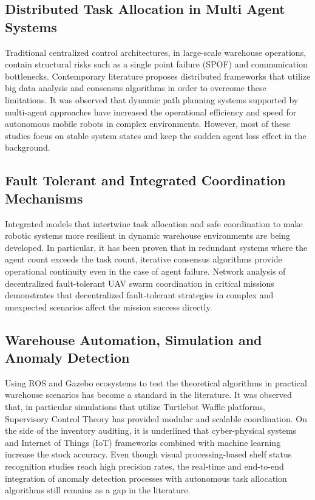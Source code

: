 \documentclass[conference]{IEEEtran}
\begin{document}
\subsection{Distributed Task Allocation in Multi Agent Systems}

Traditional centralized control architectures, in large-scale warehouse operations, contain structural risks such as a single point failure (SPOF) and communication bottlenecks. Contemporary literature proposes distributed frameworks that utilize big data analysis and consensus algorithms in order to overcome these limitations\cite{hayes2026decentralized}. It was observed that dynamic path planning systems supported by multi-agent approaches have increased the operational efficiency and speed for autonomous mobile robots in complex environments\cite{fourie2025development}. However, most of these studies focus on stable system states and keep the sudden agent loss effect in the background.

\subsection{Fault Tolerant and Integrated Coordination Mechanisms}

Integrated models that intertwine task allocation and safe coordination to make robotic systems more resilient in dynamic warehouse environments are being developed\cite{miele2025distributed}. In particular, it has been proven that in redundant systems where the agent count exceeds the task count, iterative consensus algorithms provide operational continuity even in the case of agent failure\cite{govoni2024decentralized}. Network analysis of decentralized fault-tolerant UAV swarm coordination in critical missions demonstrates that decentralized fault-tolerant strategies in complex and unexpected scenarios affect the mission success directly\cite{chandran2024network}.

\subsection{Warehouse Automation, Simulation and Anomaly Detection}

Using ROS and Gazebo ecosystems to test the theoretical algorithms in practical warehouse scenarios has become a standard in the literature. It was observed that, in particular simulations that utilize Turtlebot Waffle platforms, Supervisory Control Theory has provided modular and scalable coordination\cite{leite2024coordination}. On the side of the inventory auditing, it is underlined that cyber-physical systems and Internet of Things (IoT) frameworks combined with machine learning increase the stock accuracy\cite{arvind2025intelligent}. Even though visual processing-based shelf status recognition studies reach high precision rates\cite{zhang2025autonomous}, the real-time and end-to-end integration of anomaly detection processes with autonomous task allocation algorithms still remains as a gap in the literature.
\end{document}
